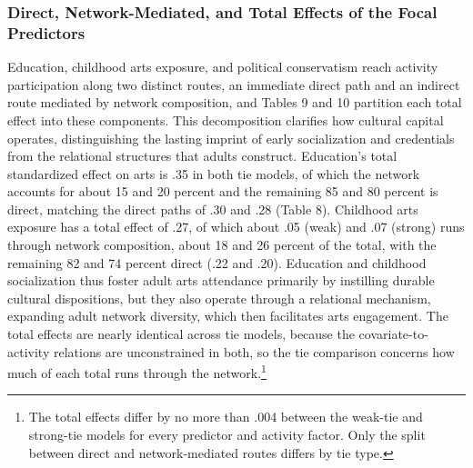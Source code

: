 \documentclass[
  12pt
]{article}
\begin{document}
\subsubsection{Direct, Network-Mediated, and Total Effects of the Focal Predictors}\label{direct-network-mediated-and-total-effects-of-the-focal-predictors}

Education, childhood arts exposure, and political conservatism reach activity participation along two distinct routes, an immediate direct path and an indirect route mediated by network composition, and Tables 9 and 10 partition each total effect into these components. This decomposition clarifies how cultural capital operates, distinguishing the lasting imprint of early socialization and credentials from the relational structures that adults construct. Education's total standardized effect on arts is .35 in both tie models, of which the network accounts for about 15 and 20 percent and the remaining 85 and 80 percent is direct, matching the direct paths of .30 and .28 (Table 8). Childhood arts exposure has a total effect of .27, of which about .05 (weak) and .07 (strong) runs through network composition, about 18 and 26 percent of the total, with the remaining 82 and 74 percent direct (.22 and .20). Education and childhood socialization thus foster adult arts attendance primarily by instilling durable cultural dispositions, but they also operate through a relational mechanism, expanding adult network diversity, which then facilitates arts engagement. The total effects are nearly identical across tie models, because the covariate-to-activity relations are unconstrained in both, so the tie comparison concerns how much of each total runs through the network.\footnote{The total effects differ by no more than .004 between the weak-tie and strong-tie models for every predictor and activity factor. Only the split between direct and network-mediated routes differs by tie type.}
\end{document}
